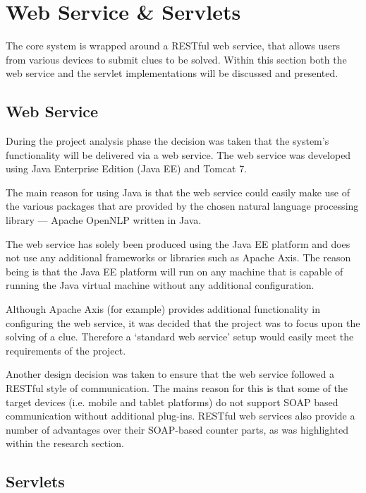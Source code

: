 \section{Web Service \& Servlets}
\label{sec:servlet}

The core system is wrapped around a RESTful web service, that allows users from
various devices to submit clues to be solved. Within this section both the web 
service and the servlet implementations will be discussed and presented.


\subsection{Web Service}
\label{sub:servlet_web_service}

During the project analysis phase the decision was taken that the system's
functionality will be delivered via a web service. The web service was developed
using Java Enterprise Edition (Java EE) and Tomcat 7.

The main reason for using Java is that the web service could easily make use of
the various packages that are provided by the chosen natural language processing
library --- Apache OpenNLP written in Java.

The web service has solely been produced using the Java EE platform and does not
use any additional frameworks or libraries such as Apache Axis. The reason being
is that the Java EE platform will run on any machine that is capable of running
the Java virtual machine without any additional configuration.

Although Apache Axis (for example) provides additional functionality in
configuring the web service, it was decided that the project was to focus upon
the solving of a clue. Therefore a `standard web service' setup would easily
meet the requirements of the project.

Another design decision was taken to ensure that the web service followed a
RESTful style of communication. The mains reason for this is that some of the
target devices (i.e. mobile and tablet platforms) do not support SOAP based
communication without additional plug-ins. RESTful web services also provide a
number of advantages over their SOAP-based counter parts, as was highlighted
within the research section.


\subsection{Servlets}
\label{sub:servlet_servlets}

